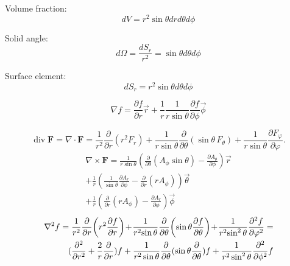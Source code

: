 \documentclass[12pt,a4paper]{article}
\begin{document}
	\vspace{.1in}
	Volume fraction: 
	\[ dV = r^2 \sin \theta dr d\theta d\phi \]
	
	\vspace{.1in}
	Solid angle: 
	\[ d\Omega = \frac{dS_r}{r^2} = \sin\theta d\theta d\phi \]
	
	\vspace{.1in}
	Surface element: 
	\[ dS_r = r^2 \sin\theta d\theta d\phi \]
	
	
	\begin{equation}
		\nabla f = \frac{\partial f}{\partial r} \vec{r} + \frac{1}{r} \frac{1}{r \sin \theta} \frac{\partial f}{\partial \phi} \vec{\phi}
	\end{equation}
	
	\begin{equation}
		\operatorname {div} \mathbf {F} =\nabla \cdot \mathbf {F} ={\frac {1}{r^{2}}}{\frac {\partial }{\partial r}}\left(r^{2}F_{r}\right)+{\frac {1}{r\sin \theta }}{\frac {\partial }{\partial \theta }}(\sin \theta \,F_{\theta })+{\frac {1}{r\sin \theta }}{\frac {\partial F_{\varphi }}{\partial \varphi }}.
	\end{equation}
	\begin{equation}
		\begin{aligned}
			\nabla \times \mathbf{F} = \frac{1}{r\sin\theta} (\frac{\partial }{\partial \theta} (A_\phi \sin \theta ) - \frac{\partial A_\theta}{\partial \phi}) \vec{r} \\
			+ \frac{1}{r}(\frac{1}{\sin\theta }\frac{\partial A_r}{\partial \phi} - \frac{\partial}{\partial r }(rA_\phi)) \vec{\theta} \\
			+ \frac{1}{r} (\frac{\partial}{\partial r}(r A_\phi) - \frac{\partial A_r}{\partial \phi}) \vec{\phi}
		\end{aligned}
	\end{equation}
	\begin{equation}
		\begin{aligned}
			\nabla^2 f = {1 \over r^{2}}{\partial  \over \partial r}\!\left(r^{2}{\partial f \over \partial r}\right)\!+\!{1 \over r^{2}\!\sin \theta }{\partial  \over \partial \theta }\!\left(\sin \theta {\partial f \over \partial \theta }\right)\!+\!{1 \over r^{2}\!\sin ^{2}\theta }{\partial ^{2}f \over \partial \varphi ^{2}} = \\ (\frac{\partial^2}{\partial r^2} + \frac{2}{r} \frac{\partial}{\partial r}) f
			+ \frac{1}{r^2 \sin \theta }\frac{\partial}{\partial \theta} (\sin \theta \frac{\partial}{\partial \theta})f
			+ \frac{1}{r^2 \sin ^2 \theta } \frac{\partial ^2}{\partial \phi ^2 } f
		\end{aligned}
	\end{equation}
	
\end{document}
